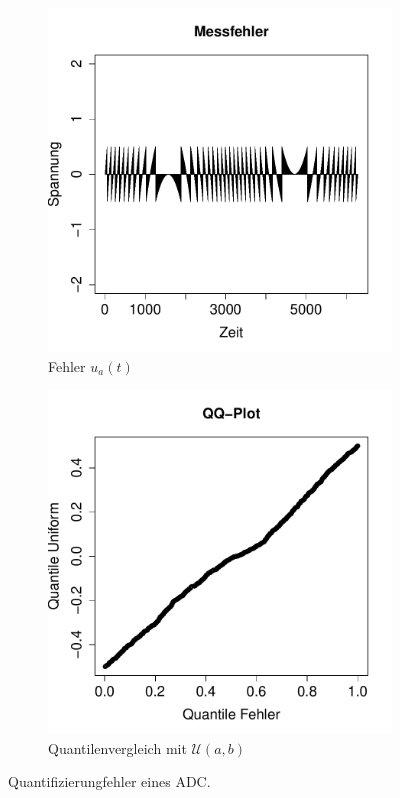 \begin{figure}[h!]
\begin{subfigure}[b]{0.48\textwidth}
\includegraphics{verteilungen-067}
\caption{Fehler $u_a(t)$}
\end{subfigure}
\begin{subfigure}[b]{0.48\textwidth}
\includegraphics{verteilungen-068}
\caption{Quantilenvergleich mit $\mathcal{U}(a,b)$}
\label{fig:adc-d}
\end{subfigure}
\caption{Quantifizierungfehler eines ADC.}
\label{fig:adc}
\end{figure}

